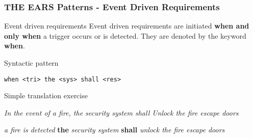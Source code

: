 \documentclass[aspectratio=169]{beamer}
\newcommand{\earse}[3]{{\bf \color{mygreen}when} {#1} {\bf \color{mypurple}the} {#2} {\bf \color{mypurple}shall} {#3}}
\begin{document}
%
%
%
\begin{frame}[fragile]
 \frametitle{THE EARS Patterns - Event Driven Requirements}
 \begin{block}{Event driven requirements}
  Event driven requirements are initiated {\bf when and only when} a trigger occurs or is detected. They are denoted  by the keyword {\bf \color{mygreen} when}.
 \end{block}
 \begin{block}{Syntactic pattern}
  \begin{lstlisting}[language=EARS]
                when <tri> the <sys> shall <res>
  \end{lstlisting}
 \end{block}
  \pause
   \begin{block}{Simple translation exercise}
   \begin{description}
   \pause
     \item [Original req:] \textit{In the event of a fire, the security system shall Unlock the fire escape doors}
     \item [In EARS:] \pause \earse{\textit{a fire is detected}}{\textit{security system}}{\textit{unlock the fire escape doors}}
   \end{description}
   \end{block}
\end{frame}  
\end{document}
